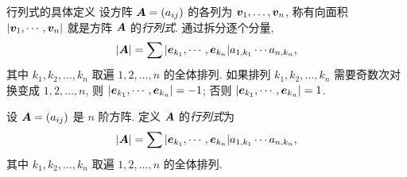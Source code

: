 

\begin{frame}{行列式的具体定义\noexer}
	\onslide<+->
	设方阵 ${\boldsymbol{A}}=(a_{ij})$ 的各列为 ${\boldsymbol{v}}_1,\dots,{\boldsymbol{v}}_n$,
	\onslide<+->
	称有向面积 $|{\boldsymbol{v}}_1,\cdots,{\boldsymbol{v}}_n|$ 就是方阵 ${\boldsymbol{A}}$ 的\emph{行列式}.
	\onslide<+->
	通过拆分逐个分量,
	\[|{\boldsymbol{A}}|=\sum |{\boldsymbol{e}}_{k_1},\cdots,{\boldsymbol{e}}_{k_n}| a_{1,k_1}\cdots a_{n,k_n}, \]
	其中 $k_1,k_2,\dots,k_n$ 取遍 $1,2,\dots,n$ 的全体排列.
	\onslide<+->
	如果排列 $k_1,k_2,\dots,k_n$ 需要奇数次对换变成 $1,2,\dots,n$, 则 
	$|{\boldsymbol{e}}_{k_1},\cdots,{\boldsymbol{e}}_{k_n}|=-1$; 否则 $|{\boldsymbol{e}}_{k_1},\cdots,{\boldsymbol{e}}_{k_n}|=1$.
	\onslide<+->
	\begin{definition}
		设 ${\boldsymbol{A}}=(a_{ij})$ 是 $n$ 阶方阵.
		定义 ${\boldsymbol{A}}$ 的\emph{行列式}为
		\[|{\boldsymbol{A}}|=\sum |{\boldsymbol{e}}_{k_1},\cdots,{\boldsymbol{e}}_{k_n}| a_{1,k_1}\cdots a_{n,k_n},\]
		其中 $k_1,k_2,\dots,k_n$ 取遍 $1,2,\dots,n$ 的全体排列.
	\end{definition}
\end{frame}


